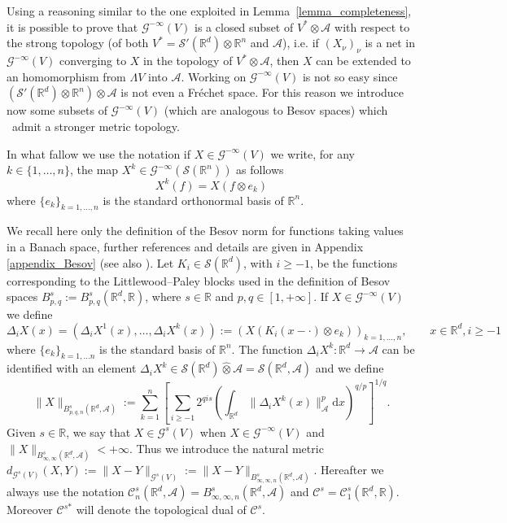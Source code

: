 \documentclass{article}
\newcommand{\assign}{:=}
\newcommand{\asterisk}{\mathord{*}}
\newcommand{\mathd}{\mathrm{d}}
\begin{document}
Using a reasoning similar to the one exploited in
Lemma~\ref{lemma_completeness}, it is possible to prove that $\mathcal{G}^{-
\infty} (V)$ is a closed subset of $V^{\asterisk} \otimes \mathcal{A}$ with
respect to the strong topology (of both $V^{\asterisk} = \mathcal{S}'
(\mathbb{R}^d) \otimes \mathbb{R}^n$ and $\mathcal{A}$), i.e. if
$(X_{\nu})_{\nu}$ is a net in $\mathcal{G}^{- \infty} (V)$ converging to $X$
in the topology of $V^{\asterisk} \otimes \mathcal{A}$, then $X$ can be
extended to an homomorphism from $\Lambda V$ into $\mathcal{A}$. Working on
$\mathcal{G}^{- \infty} (V)$ is not so easy since $(\mathcal{S}'
(\mathbb{R}^d) \otimes \mathbb{R}^n) \otimes \mathcal{A}$ is not even a
Fr{\'e}chet space. For this reason we introduce now some subsets of
$\mathcal{G}^{- \infty} (V)$ (which are analogous to Besov spaces) which \
admit a stronger metric topology.

\begin{remark}
  In what fallow we use the notation if $X \in \mathcal{G}^{- \infty} (V)$ we
  write, for any $k \in \{ 1, \ldots, n \}$, the map $X^k \in \mathcal{G}^{-
  \infty} (\mathcal{S} (\mathbb{R}^n))$ as follows
  \[ X^k (f) = X (f \otimes e_k) \]
  where $\{ e_k \}_{k = 1, \ldots, n}$ is the standard orthonormal basis of
  $\mathbb{R}^n$.
\end{remark}

We recall here only the definition of the Besov norm for functions taking
values in a Banach space, further references and details are given in Appendix
\ref{appendix_Besov} (see also {\cite{Amann1997,Amann2019}}). Let $K_i \in
\mathcal{S} (\mathbb{R}^d)$, with $i \geqslant - 1$, be the functions
corresponding to the Littlewood--Paley blocks used in the definition of Besov
spaces $B^s_{p, q} \assign B^s_{p, q} (\mathbb{R}^d, \mathbb{R})$, where $s
\in \mathbb{R}$ and $p, q \in [1, + \infty]$. If $X \in \mathcal{G}^{- \infty}
(V)$ we define
\[ \Delta_i X (x) = (\Delta_i X^1 (x), \ldots, \Delta_i X^k (x)) \assign (X
   (K_i (x - \cdot) \otimes e_k))_{k = 1, \ldots, n}, \qquad x \in
   \mathbb{R}^d, i \geqslant - 1 \]
where $\{ e_k \}_{k = 1, \ldots n}$ is the standard basis of $\mathbb{R}^n$.
The function $\Delta_i X^k : \mathbb{R}^d \rightarrow \mathcal{A}$ can be
identified with an element $\Delta_i X^k \in \mathcal{S} (\mathbb{R}^d)
\hat{\otimes} \mathcal{A} = \mathcal{S} (\mathbb{R}^d, \mathcal{A})$ and we
define
\[ \| X \|_{B^s_{p, q, n} (\mathbb{R}^d, \mathcal{A})} \assign \sum_{k = 1}^n
   \left[ \sum_{i \geqslant - 1} 2^{q i s} \left( \int_{\mathbb{R}^d} \|
   \Delta_i X^k (x) \|_{\mathcal{A}}^p \mathd x \right)^{q / p}_{} \right]^{1
   / q} . \]
Given $s \in \mathbb{R}$, we say that $X \in \mathcal{G}^s (V)$ when $X \in
\mathcal{G}^{- \infty} (V)$ and $\| X \|_{B^s_{\infty, \infty} (\mathbb{R}^d,
\mathcal{A})} < + \infty$. Thus we introduce the natural metric
$d_{\mathcal{G}^s (V)} (X, Y) \assign \| X - Y \|_{\mathcal{G}^s (V)} \assign
\| X - Y \|_{B^s_{\infty, \infty, n} (\mathbb{R}^d, \mathcal{A})}$. Hereafter
we always use the notation $\mathcal{C}^s_n (\mathbb{R}^d, \mathcal{A}) =
B^s_{\infty, \infty, n} (\mathbb{R}^d, \mathcal{A})$ and $\mathcal{C}^s =
\mathcal{C}^s_1 (\mathbb{R}^d, \mathbb{R})$. Moreover $\mathcal{C}^{s
\asterisk}$ will denote the topological dual of $\mathcal{C}^s$.
\end{document}
